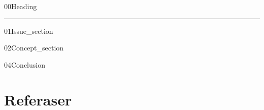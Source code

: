 \documentclass[a4paper,11pt,norsk]{article}
\begin{document}
{00Heading}

\setlength{\parskip}{0ex}
\renewcommand{\baselinestretch}{0.1}\normalsize
\tableofcontents
\renewcommand{\baselinestretch}{1.00}\normalsize
\setlength{\parskip}{2ex}
\rule{\textwidth}{1pt}


\newpage
{01Issue_section}

\newpage
{02Concept_section}


\newpage
{04Conclusion}


\newpage
\section{Referaser}
\label{sec:References}
\printbibliography{}
\end{document}
